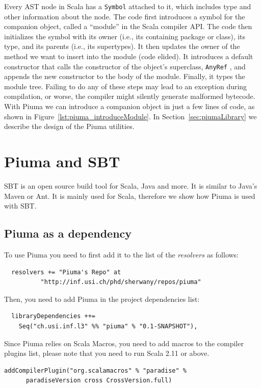 \documentclass{article}
\renewcommand\c[1]{
  \ifmmode
    \text{#1}
  \else
    \lstinline{#1}
  \fi
}
\begin{document}
Every AST node in Scala has a \c{Symbol} attached to it, which includes type
and other information about the node.  The code first introduces a symbol for
the companion object, called a ``module'' in the Scala compiler API.  The code
then initializes the symbol with its owner (i.e., its containing package or
class), its type, and its parents (i.e., its supertypes).  It then updates the
owner of the method we want to insert into the module (code elided).  It
introduces a default constructor that calls the constructor of the object's
superclass, \c{AnyRef}, and appends the new constructor to the body of the
module.  Finally, it types the module tree.  Failing to do any of these steps
may lead to an exception during compilation, or worse, the compiler might
silently generate malformed bytecode. With Piuma we can introduce a
companion object in just a few lines of code, as shown in
Figure~\ref{lst:piuma_introduceModule}.  In
Section~\ref{sec:piumaLibrary} we describe the design of the Piuma 
utilities.


\section{Piuma and SBT}
SBT is an open source build tool for Scala, Java and more. It is similar to
Java's Maven or Ant. It is mainly used for Scala, therefore we show how
Piuma is used with SBT. 


\subsection{Piuma as a dependency}
To use Piuma you need to first add it to the list of the \emph{resolvers}
as follows: 

\begin{verbatim}
  resolvers += "Piuma's Repo" at 
          "http://inf.usi.ch/phd/sherwany/repos/piuma"
\end{verbatim}


\noindent
Then, you need to add Piuma in the project dependencies list:

\begin{verbatim}
  libraryDependencies ++= 
    Seq("ch.usi.inf.l3" %% "piuma" % "0.1-SNAPSHOT"),
\end{verbatim}


\noindent
Since Piuma relies on Scala Macros, you need to add macros to the compiler
plugins list, please note that you need to run Scala 2.11 or above.

\begin{verbatim}
addCompilerPlugin("org.scalamacros" % "paradise" % 
      paradiseVersion cross CrossVersion.full)
\end{verbatim}
\end{document}
